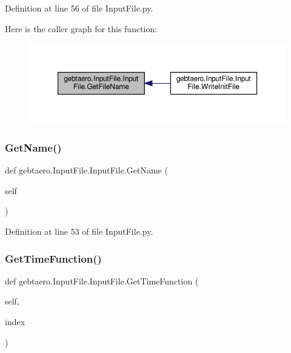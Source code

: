 Definition at line 56 of file Input\+File.\+py.

Here is the caller graph for this function\+:\nopagebreak
\begin{figure}[H]
\begin{center}
\leavevmode
\includegraphics[width=350pt]{classgebtaero_1_1_input_file_1_1_input_file_a3fe8f05410f29d9c555adbee5dae9e16_icgraph}
\end{center}
\end{figure}
\mbox{\label{classgebtaero_1_1_input_file_1_1_input_file_acae95b1a0b2631341592cf0abe4178c8}} 
\subsubsection{\texorpdfstring{Get\+Name()}{GetName()}}
{\footnotesize\ttfamily def gebtaero.\+Input\+File.\+Input\+File.\+Get\+Name (\begin{DoxyParamCaption}\item[{}]{self }\end{DoxyParamCaption})}



Definition at line 53 of file Input\+File.\+py.

\mbox{\label{classgebtaero_1_1_input_file_1_1_input_file_a5d53bb9ae864d002dfbbee1231b91881}} 
\subsubsection{\texorpdfstring{Get\+Time\+Function()}{GetTimeFunction()}}
{\footnotesize\ttfamily def gebtaero.\+Input\+File.\+Input\+File.\+Get\+Time\+Function (\begin{DoxyParamCaption}\item[{}]{self,  }\item[{}]{index }\end{DoxyParamCaption})}



